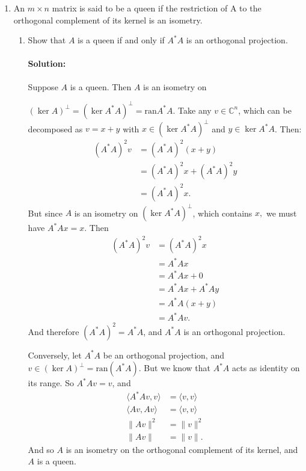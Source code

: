 \documentclass{article}
\begin{document}
\begin{enumerate} 

\item An $m \times n$ matrix is said to be a queen if the restriction of A to the orthogonal complement of its kernel is an isometry.

\begin{enumerate}[label= (\alph*)] 
\item Show that $A$ is a queen if and only if $A^* A$ is an orthogonal projection.
    \paragraph{Solution: }Suppose $A$ is a queen. Then $A$ is an isometry on 

    $(\ker A)^{\perp}=(\ker A^* A)^{\perp}=\text{ran} A^* A$. Take any $v\in \mathbb{C}^{n}$, which can be decomposed as $v=x+y$ with $x\in (\ker A^* A)^\perp$ and $y\in \ker A^* A$. Then:
    \begin{align*}
        (A^* A)^2v&= (A^* A)^2(x+y) \\
            &= (A^* A)^2x +(A^* A)^2y\\
            &= (A^* A)^2x
    .\end{align*}
    But since $A$ is an isometry on $(\ker A^* A)^{\perp}$, which contains $x,$ we must have $A^* Ax=x$. Then
    \begin{align*}
        (A^* A)^2v &= (A^* A)^2x \\
        &= A^* Ax \\
        &= A^* Ax +0\\
        &= A^* Ax +A^* Ay\\
        &= A^* A(x+y)\\
        &= A^* Av
    .\end{align*}
    And therefore $(A^* A)^2=A^* A$, and $A^* A$ is an orthogonal projection.

    Conversely, let $A^* A$ be an orthogonal projection, and $v\in (\ker A)^{\perp}=\text{ran}(A^* A)$. But we know that $A^* A$ acts as identity on its range. So $A^* Av=v$, and
    \begin{align*}
       \langle A^* Av,v \rangle&= \langle v,v \rangle \\
       \langle Av,Av \rangle&= \langle v,v \rangle \\
       \|Av\|^2&= \|v\|^2 \\
       \|Av\|&= \|v\|
    .\end{align*}
    And so $A$ is an isometry on the orthogonal complement of its kernel, and $A$ is a queen.


\end{enumerate}
\end{enumerate}
\end{document}
